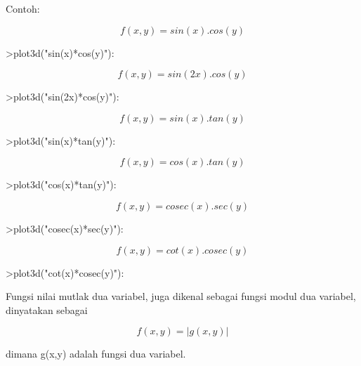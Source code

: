 \documentclass[a4paper,10pt]{article}
\begin{document}
\begin{eulernotebook}
\begin{eulercomment}
\begin{eulercomment}
\begin{eulercomment}
\begin{eulercomment}
\begin{eulercomment}
\begin{eulercomment}
\begin{eulercomment}
\begin{eulercomment}
\begin{eulercomment}
\begin{eulercomment}
\begin{eulercomment}
\begin{eulercomment}
\begin{eulercomment}
Contoh:\\
\end{eulercomment}
\begin{eulerformula}
\[
f(x,y)=sin(x).cos(y)
\]
\end{eulerformula}
\begin{eulerprompt}
>plot3d("sin(x)*cos(y)"):
\end{eulerprompt}
\begin{eulerformula}
\[
f(x,y)=sin(2x).cos(y)
\]
\end{eulerformula}
\begin{eulerprompt}
>plot3d("sin(2x)*cos(y)"):
\end{eulerprompt}
\begin{eulerformula}
\[
f(x,y)=sin(x).tan(y)
\]
\end{eulerformula}
\begin{eulerprompt}
>plot3d("sin(x)*tan(y)"):
\end{eulerprompt}
\begin{eulerformula}
\[
f(x,y)=cos(x).tan(y)
\]
\end{eulerformula}
\begin{eulerprompt}
>plot3d("cos(x)*tan(y)"):
\end{eulerprompt}
\begin{eulerformula}
\[
f(x,y)=cosec(x).sec(y)
\]
\end{eulerformula}
\begin{eulerprompt}
>plot3d("cosec(x)*sec(y)"):
\end{eulerprompt}
\begin{eulerformula}
\[
f(x,y)=cot(x).cosec(y)
\]
\end{eulerformula}
\begin{eulerprompt}
>plot3d("cot(x)*cosec(y)"):
\end{eulerprompt}
\begin{eulercomment}
Fungsi nilai mutlak dua variabel, juga dikenal sebagai fungsi modul
dua variabel, dinyatakan sebagai\\
\end{eulercomment}
\begin{eulerformula}
\[
f(x,y)=|g(x,y)|
\]
\end{eulerformula}
\begin{eulercomment}
dimana g(x,y) adalah fungsi dua variabel.


\end{eulercomment}
\end{eulercomment}
\end{eulercomment}
\end{eulercomment}
\end{eulercomment}
\end{eulercomment}
\end{eulercomment}
\end{eulercomment}
\end{eulercomment}
\end{eulercomment}
\end{eulercomment}
\end{eulercomment}
\end{eulercomment}
\end{eulernotebook}
\end{document}
